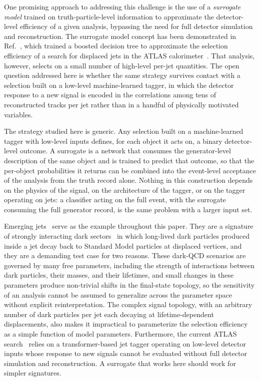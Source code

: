 \documentclass[a4paper,11pt]{article}
\begin{document}
One promising approach to addressing this challenge is the use of a
\emph{surrogate model} trained on truth-particle-level information to
approximate the detector-level efficiency of a given analysis,
bypassing the need for full detector simulation and reconstruction.
The surrogate model concept has been demonstrated in
Ref.~\cite{Corpe:2025rtz}, which trained a boosted decision tree to
approximate the selection efficiency of a search for displaced jets in
the ATLAS calorimeter~\cite{ATLAS:CalRatio}. That analysis, however,
selects on a small number of high-level per-jet quantities. The open
question addressed here is whether the same strategy survives contact
with a selection built on a low-level machine-learned tagger, in
which the detector response to a new signal is encoded in the
correlations among tens of reconstructed tracks per jet rather than in
a handful of physically motivated variables.

The strategy studied here is generic. Any selection built on a
machine-learned tagger with low-level inputs defines, for each object it
acts on, a binary detector-level outcome. A surrogate is a network that
consumes the generator-level description of the same object and is
trained to predict that outcome, so that the per-object probabilities it
returns can be combined into the event-level acceptance of the analysis
from the truth record alone. Nothing in this construction depends on
the physics of the signal, on the architecture of the tagger, or on the
tagger operating on jets: a classifier acting on the full event, with
the surrogate consuming the full generator record, is the same problem
with a larger input set.

Emerging jets~\cite{Schwaller:2015gea} serve as the example throughout
this paper. They are a signature of strongly interacting dark
sectors~\cite{Strassler:2006im,Han:2007ae,Bai:2013xga,Albouy:2022cin}
in which long-lived dark particles produced inside a jet decay back to
Standard Model particles at displaced vertices, and they are a
demanding test case for two reasons. These dark-QCD scenarios are
governed by many free parameters, including the strength of
interactions between dark particles, their masses, and their lifetimes,
and small changes in these parameters produce non-trivial shifts in the
final-state topology, so the sensitivity of an analysis cannot be
assumed to generalize across the parameter space without explicit
reinterpretation. The complex signal topology, with an arbitrary number
of dark particles per jet each decaying at lifetime-dependent
displacements, also makes it impractical to parameterize the selection
efficiency as a simple function of model parameters. Furthermore, the
current ATLAS search~\cite{ATLAS:EJ} relies on a transformer-based jet
tagger operating on low-level detector inputs whose response to new
signals cannot be evaluated without full detector simulation and
reconstruction. A surrogate that works here should work for simpler
signatures.
\end{document}
